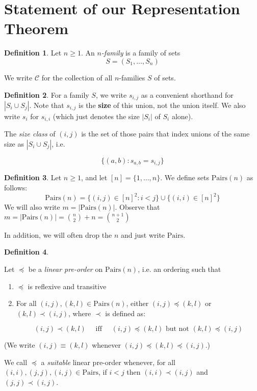 \documentclass[12pt]{article}
\theoremstyle{definition}
\newtheorem{definition}{Definition}
\newcommand{\set}[1]{\{ #1 \}}
\newcommand{\quadiff}{\quad \mbox{ iff } \quad}
\newcommand{\Pairs}{\mbox{Pairs}}
\begin{document}
\section{Statement of our Representation Theorem}

\begin{definition}

Let $n\geq 1$.
An \emph{$n$-family} is  a family of sets
\[ S = (S_1, \ldots, S_n)\]

We write $\mathcal{C}$ for the
collection of all $n$-families $S$ of sets.
\end{definition}


\begin{definition}

For a family $S$, we write $s_{i,j}$ as a convenient shorthand
for $|S_i\cup S_j|$.  Note that $s_{i,j}$
is the \textbf{size} of this union, not the union itself.
We also write $s_i$ for $s_{i,i}$ (which just denotes the size $|S_i|$ of $S_i$ alone).

The \emph{size class} of $(i,j)$ is the set of those pairs that index unions of the same size as $|S_i\cup S_j|$, i.e.

\[\set{(a,b): s_{a,b}= s_{i,j}}\]
\end{definition}


\begin{definition}
Let $n\geq 1$, and let $[n] = \set{1,\ldots, n}$.
We define  sets $\Pairs(n)$ as follows:
\[
\Pairs(n) = \set{(i,j)\in [n]^2:  i < j} \cup \set{(i,i)\in [n]^2}
\]
We will also write $m = |\Pairs(n)|$.  Observe that $m = |\Pairs(n)| = \binom{n}{2} + n = \binom{n+1}{2}$  

In addition, we will often drop the $n$ and just write $\Pairs$.
\end{definition}


\begin{definition}\label{def-suitable}

Let $\preceq$ be a \emph{linear pre-order} on $\Pairs(n)$, i.e. an ordering such that
\begin{enumerate}
    \item $\preceq$ is reflexive and transitive
    \item For all $(i, j), (k, l) \in \Pairs(n)$,
          either $(i, j) \preceq (k, l)$ or $(k, l) \prec (i, j)$, where $\prec$ is defined as:
          
          \[ (i,j) \prec(k,l) \quadiff  (i,j) \preceq (k,l) \mbox{ but not } (k,l)\preceq     (i,j)
          \]
\end{enumerate}

(We write $(i,j)\equiv (k,l)$ whenever
$(i,j)\preceq (k,l) \preceq (i,j)$.)

We call $\preceq$ a \emph{suitable} linear pre-order whenever, for all $(i, i), (j, j), (i, j) \in \Pairs$, if $i < j$ then $(i, i) \prec (i, j)$ and $(j, j) \prec (i, j)$.
\end{definition}
\end{document}
